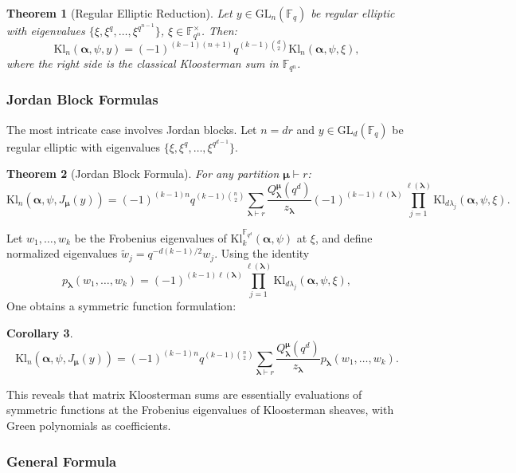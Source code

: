 \documentclass[11pt]{article}
\newtheorem{theorem}{Theorem}[section]
\newtheorem{corollary}[theorem]{Corollary}
\newcommand{\Fq}{\mathbb{F}_q}
\newcommand{\Fqd}{\mathbb{F}_{q^d}}
\newcommand{\GL}{\mathrm{GL}}
\newcommand{\Kl}{\mathrm{Kl}}
\begin{document}
\begin{theorem}[Regular Elliptic Reduction]\cite{zelingher2023matrix}
\label{thm:reg_elliptic}
Let $y \in \GL_n(\Fq)$ be regular elliptic with eigenvalues $\{\xi, \xi^q, \ldots, \xi^{q^{n-1}}\}$, $\xi \in \mathbb{F}_{q^n}^\times$. Then:
\[
\Kl_n(\bm{\alpha}, \psi, y) = (-1)^{(k-1)(n+1)} q^{(k-1)\binom{d}{2}} \Kl_n(\bm{\alpha}, \psi, \xi),
\]
where the right side is the classical Kloosterman sum in $\mathbb{F}_{q^n}$.
\end{theorem}

\subsubsection{Jordan Block Formulas}

The most intricate case involves Jordan blocks. Let $n = dr$ and $y \in \GL_d(\Fq)$ be regular elliptic with eigenvalues $\{\xi, \xi^q, \ldots, \xi^{q^{d-1}}\}$.
\medskip

\begin{theorem}[Jordan Block Formula] \cite{zelingher2023matrix}
\label{thm:jordan_formula}
For any partition $\bm{\mu} \vdash r$:
\[
\Kl_n(\bm{\alpha}, \psi, J_{\bm{\mu}}(y)) = (-1)^{(k-1)n} q^{(k-1)\binom{n}{2}} \sum_{\bm{\lambda} \vdash r} \frac{Q_{\bm{\lambda}}^{\bm{\mu}}(q^d)}{z_{\bm{\lambda}}} (-1)^{(k-1)\ell(\bm{\lambda})} \prod_{j=1}^{\ell(\bm{\lambda})} \Kl_{d\lambda_j}(\bm{\alpha}, \psi, \xi).
\]
\end{theorem}

Let $w_1, \ldots, w_k$ be the Frobenius eigenvalues of $\Kl_k^{\Fqd}(\bm{\alpha},\psi)$ at $\xi$, and define normalized eigenvalues $\widetilde{w}_j = q^{-d(k-1)/2} w_j$. Using the identity
\[
p_{\bm{\lambda}}(w_1, \ldots, w_k) = (-1)^{(k-1)\ell(\bm{\lambda})} \prod_{j=1}^{\ell(\bm{\lambda})} \Kl_{d\lambda_j}(\bm{\alpha}, \psi, \xi),
\]
One obtains a symmetric function formulation:
\medskip

\begin{corollary}
\[
\Kl_n(\bm{\alpha}, \psi, J_{\bm{\mu}}(y)) = (-1)^{(k-1)n} q^{(k-1)\binom{n}{2}} \sum_{\bm{\lambda} \vdash r} \frac{Q_{\bm{\lambda}}^{\bm{\mu}}(q^d)}{z_{\bm{\lambda}}} p_{\bm{\lambda}}(w_1, \ldots, w_k).
\]
\end{corollary}

This reveals that matrix Kloosterman sums are essentially evaluations of symmetric functions at the Frobenius eigenvalues of Kloosterman sheaves, with Green polynomials as coefficients.

\subsubsection{General Formula}
\end{document}
